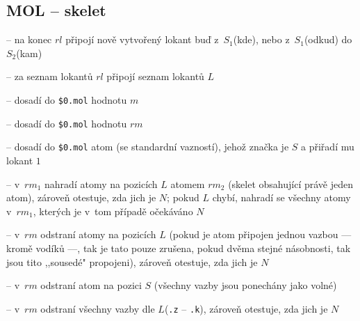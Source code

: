 \subsection{MOL -- skelet}
\begin{itemize}
	 -- na konec $rl$ připojí nově vytvořený
				lokant buď z~$S_1$(kde), nebo z~$S_1$(odkud) do $S_2$(kam)


	 -- za seznam lokantů $rl$ připojí seznam lokantů $L$


	 -- dosadí do {\tt \$0.mol} hodnotu $m$


	 -- dosadí do {\tt \$0.mol} hodnotu $rm$


	 -- dosadí do {\tt \$0.mol} atom (se standardní vazností),
				jehož značka je $S$ a přiřadí mu lokant {\til{}$1$\til{}}


	 -- v~$rm_1$ nahradí atomy na pozicích
				$L$ atomem $rm_2$ (skelet obsahující právě jeden atom), zároveň
				otestuje, zda jich je $N$; pokud $L$ chybí, nahradí se všechny
				atomy v~$rm_1$, kterých je v~tom případě očekáváno $N$


	 -- v~$rm$ odstraní atomy na pozicích $L$ (pokud
				je atom připojen jednou vazbou --- kromě vodíků ---, tak je tato
				pouze zrušena, pokud dvěma stejné násobnosti, tak jsou tito
				,,sousedé" propojeni), zároveň otestuje, zda jich je $N$


	 -- v~$rm$ odstraní atom na pozici $S$ (všechny vazby
				jsou ponechány jako volné)


	 -- v~$rm$ odstraní všechny vazby dle $L$({\tt .z}
				-- {\tt .k}), zároveň otestuje, zda jich je $N$


\end{itemize}
